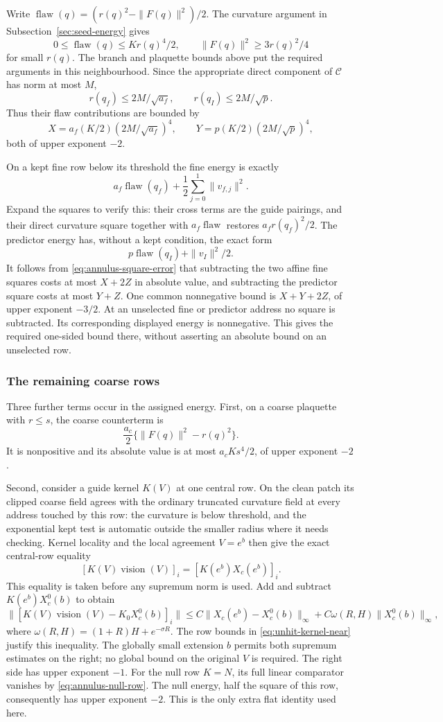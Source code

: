 Write $\operatorname{flaw}(q)=(r(q)^2-\|F(q)\|^2)/2$.
The curvature argument in Subsection~\ref{sec:seed-energy} gives
\[
 0\le\operatorname{flaw}(q)\le K r(q)^4/2,
 \qquad \|F(q)\|^2\ge3r(q)^2/4
\]
for small $r(q)$. The branch and plaquette bounds above put the
required arguments in this neighbourhood. Since the appropriate
direct component of $\mathcal C$ has norm at most $M$,
\[
 r(q_f)\le2M/\sqrt{a_f},\qquad
 r(q_I)\le2M/\sqrt p.
\]
Thus their flaw contributions are bounded by
\[
 X=a_f(K/2)(2M/\sqrt{a_f})^4,
 \qquad Y=p(K/2)(2M/\sqrt p)^4,
\]
both of upper exponent $-2$.

On a kept fine row below its threshold the fine energy is exactly
\[
 a_f\operatorname{flaw}(q_f)
       +\frac12\sum_{j=0}^1\|v_{f,j}\|^2.
\]
Expand the squares to verify this: their cross terms are the
guide pairings, and their direct curvature square together with
$a_f\operatorname{flaw}$ restores $a_fr(q_f)^2/2$.
The predictor energy has, without a kept condition, the exact form
\[
 p\operatorname{flaw}(q_I)+\|v_I\|^2/2.
\]
It follows from \eqref{eq:annulus-square-error} that subtracting
the two affine fine squares costs at most $X+2Z$ in absolute
value, and subtracting the predictor square costs at most $Y+Z$.
One common nonnegative bound is $X+Y+2Z$, of upper exponent
$-3/2$. At an unselected fine or predictor address no square is
subtracted. Its corresponding displayed energy is nonnegative.
This gives the required one-sided bound there, without asserting
an absolute bound on an unselected row.

\subsubsection{The remaining coarse rows}
Three further terms occur in the assigned energy. First, on a
coarse plaquette with $r\le s$, the coarse counterterm is
\[
 \frac{a_c}{2}\{\|F(q)\|^2-r(q)^2\}.
\]
It is nonpositive and its absolute value is at most
$a_cKs^4/2$, of upper exponent $-2$.

Second, consider a guide kernel $K(V)$ at one central row.
On the clean patch its clipped coarse field agrees with the ordinary
truncated curvature field at every address touched by this row:
the curvature is below threshold, and the exponential kept test is
automatic outside the smaller radius where it needs checking.
Kernel locality and the local agreement $V=e^b$ then give the
exact central-row equality
\[
 [K(V)\operatorname{vision}(V)]_i=[K(e^b)X_c(e^b)]_i.
\]
This equality is taken before any supremum norm is used. Add and
subtract $K(e^b)X_c^0(b)$ to obtain
\[
 \bigl\|[K(V)\operatorname{vision}(V)-K_0X_c^0(b)]_i\bigr\|
 \le C\|X_c(e^b)-X_c^0(b)\|_\infty
       +C\omega(R,H)\|X_c^0(b)\|_\infty,
\]
where $\omega(R,H)=(1+R)H+e^{-\sigma R}$. The row bounds in
\eqref{eq:unhit-kernel-near} justify this inequality. The globally
small extension $b$ permits both supremum estimates on the right;
no global bound on the original $V$ is required. The right side has
upper exponent $-1$. For the null row $K=N$, its full linear
comparator vanishes by \eqref{eq:annulus-null-row}. The null
energy, half the square of this row, consequently has upper
exponent $-2$. This is the only extra flat identity used here.

